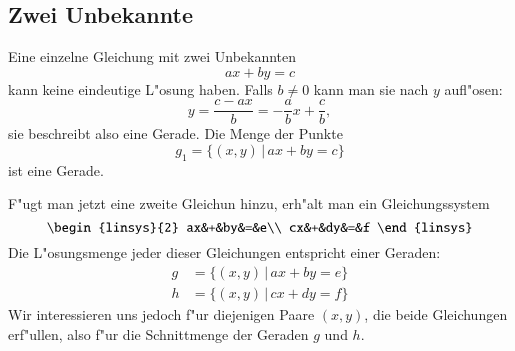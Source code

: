 \subsection{Zwei Unbekannte}
Eine einzelne Gleichung mit zwei Unbekannten 
\[
ax+by=c
\]
kann keine eindeutige L"osung haben. Falls $b\ne 0$ kann man
sie nach $y$ aufl"osen:
\[
y=\frac{c-ax}b=-\frac{a}{b}x+\frac{c}b,
\]
sie beschreibt also eine Gerade. Die Menge der Punkte 
\[
g_1=\{(x,y)\,|\,ax+by=c\}
\]
ist eine Gerade.

F"ugt man jetzt eine zweite Gleichun hinzu, erh"alt man
ein Gleichungssystem
\[
\begin{linsys}{2}
ax&+&by&=&e\\
cx&+&dy&=&f
\end{linsys}
\]
Die L"osungsmenge jeder dieser Gleichungen entspricht einer
Geraden:
\begin{align*}
g&=\{(x,y)\,|\,ax+by=e\}\\
h&=\{(x,y)\,|\,cx+dy=f\}
\end{align*}
Wir interessieren uns jedoch f"ur diejenigen Paare $(x,y)$,
die beide Gleichungen erf"ullen, also f"ur die Schnittmenge
der Geraden $g$ und $h$.

